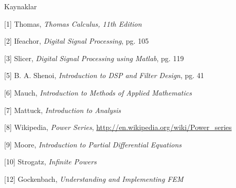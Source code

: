 \documentclass[12pt,fleqn]{article}\usepackage{../../common}
\begin{document}
Kaynaklar 

[1] Thomas, {\em Thomas Calculus, 11th Edition}

[2] Ifeachor, {\em Digital Signal Processing}, pg. 105

[3] Slicer, {\em Digital Signal Processing using Matlab}, pg. 119

[5] B. A. Shenoi, {\em Introduction to DSP and Filter Design}, pg. 41

[6] Mauch, {\em Introduction to Methods of Applied Mathematics}

[7] Mattuck, {\em Introduction to Analysis}

[8] Wikipedia, {\em Power Series}, \url{http://en.wikipedia.org/wiki/Power_series}

[9] Moore, {\em Introduction to Partial Differential Equations}

[10] Strogatz, {\em Infinite Powers}

[12] Gockenbach, {\em Understanding and Implementing FEM}
\end{document}
